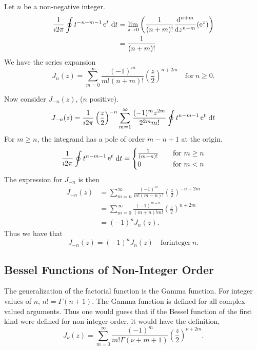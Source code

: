 Let $n$ be a non-negative integer.
\begin{align*}
  \frac{1}{\imath 2 \pi} \oint t^{-n-m-1} \mathop{\mathrm{e}}\nolimits^t\,\mathrm{d} t
  &= \lim_{z \to 0} \left( \frac{1}{(n + m)!} \frac{\mathrm{d}^{n+m}}{\mathrm{d} z^{n+m}}
    (\mathop{\mathrm{e}}\nolimits^z) \right) 
  \\
  &= \frac{1}{(n+m)!}
\end{align*}
We have the series expansion
\[ 
\boxed{ 
  J_n(z) = \sum_{m = 0}^\infty \frac{(-1)^m}{m! (n+m)!} \left( 
    \frac{z}{2}\right)^{n+2m} \quad \mathrm{for}\ n \geq 0. 
  } 
\]

Now consider $J_{-n}(z)$, ($n$ positive).
\[ 
J_{-n}(z) = \frac{1}{\imath 2 \pi} \left( \frac{z}{2} \right)^{-n} \sum_{m = 1}^\infty
\frac{ (-1)^m z^{2m}}{2^{2m} m!} \oint t^{n-m-1} \mathop{\mathrm{e}}\nolimits^t\,\mathrm{d} t 
\]
For $m \geq n$, the integrand has a pole of order $m - n + 1$ at the origin.
\[ 
\frac{1}{\imath 2 \pi} \oint t^{n-m-1}\mathop{\mathrm{e}}\nolimits^t\,\mathrm{d} t = 
\begin{cases}
  \frac{1}{(m - n)!} \quad &\mathrm{for}\ m \geq n \\
  0 \quad &\mathrm{for}\ m < n
\end{cases} \]
The expression for $J_{-n}$ is then
\begin{align*}
  J_{-n}(z)
  &= \sum_{m=n}^\infty \frac{(-1)^m}{m! (m - n)!} \left( \frac{z}{2} \right)^{-n+2m} 
  \\
  &= \sum_{m = 0}^\infty \frac{(-1)^{m + n}}{(m + n)! m!} \left( \frac{z}{2} \right)^{n + 2 m} 
  \\
  &= (-1)^n J_n(z).
\end{align*}
Thus we have that 
\[ 
\boxed{
  J_{-n}(z) = (-1)^n J_n(z) \quad \mathrm{for integer}\ n.
  } 
\]








\subsection{Bessel Functions of Non-Integer Order}

The generalization of the factorial function is the Gamma function.
For integer values of $n$, $n! = \Gamma(n+1)$.  The Gamma function is defined
for all complex-valued arguments.  Thus one would guess that if the 
Bessel function of the first kind were defined for non-integer order, it
would have the definition,
\[ 
J_\nu(z) = \sum_{m = 0}^\infty \frac{(-1)^m}{m! \Gamma(\nu+m+1)} \left( \frac{z}{2} \right)^{\nu+2m}.
\]

